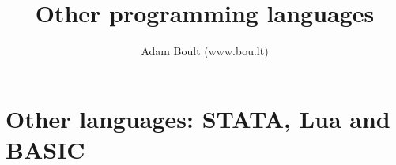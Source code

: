 \documentclass[oneside]{book}
\begin{document}
\author{Adam Boult (www.bou.lt)}
\title{Other programming languages}
\maketitle

\setcounter{tocdepth}{0}
\tableofcontents



\part{Other languages: STATA, Lua and BASIC}



\end{document}
